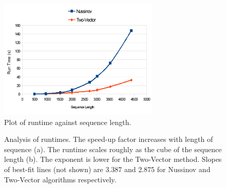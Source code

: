 \documentclass[journal]{IEEEtran}
\begin{document}
\begin{figure}[h]
\centering
\includegraphics[width=3.0in]{fig3_1}%

\caption{Plot of runtime against sequence length.}
\label{runtime}
\end{figure}

\begin{figure}[t]
\centering
{}
\hfil
{}
\caption{Analysis of runtimes. The speed-up factor increases with length of sequence (a). The runtime scales roughly as the cube of the sequence length (b). The exponent is lower for the Two-Vector method. Slopes of best-fit lines (not shown) are 3.387 and 2.875 for Nussinov and Two-Vector algorithms respectively.}
\label{runtime_analysis}
\end{figure}
%
\end{document}
